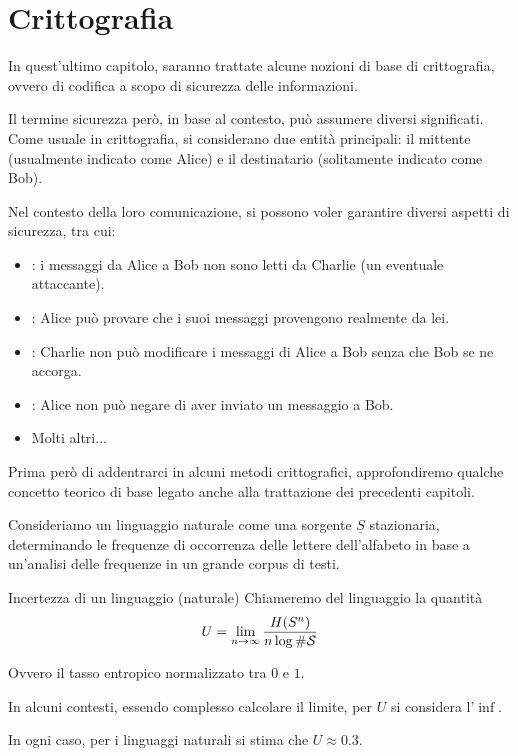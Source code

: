 \chapter{Crittografia}

In quest'ultimo capitolo, saranno trattate alcune nozioni di base di crittografia, ovvero di codifica a scopo di sicurezza delle informazioni.

Il termine sicurezza però, in base al contesto, può assumere diversi significati.
Come usuale in crittografia, si considerano due entità principali: il mittente (usualmente indicato come Alice) e il destinatario (solitamente indicato come Bob).

Nel contesto della loro comunicazione, si possono voler garantire diversi aspetti di sicurezza, tra cui:

\begin{itemize}
  \item {}: i messaggi da Alice a Bob non sono letti da Charlie (un eventuale attaccante).
  \item {}: Alice può provare che i suoi messaggi provengono realmente da lei.
  \item {}: Charlie non può modificare i messaggi di Alice a Bob senza che Bob se ne accorga.
  \item {}: Alice non può negare di aver inviato un messaggio a Bob.
  \item Molti altri...
\end{itemize}

Prima però di addentrarci in alcuni metodi crittografici, approfondiremo qualche concetto teorico di base legato anche alla trattazione dei precedenti capitoli.

Consideriamo un linguaggio naturale come una sorgente \(\underline{S}\) stazionaria, determinando le frequenze di occorrenza delle lettere dell'alfabeto in base a un'analisi delle frequenze in un grande corpus di testi.

\begin{definition}{Incertezza di un linguaggio (naturale)}
  Chiameremo  del linguaggio la quantità 
  \[U = \lim_{n\to\infty} \frac{H(S^n)}{n\log \#\mathcal{S}}\]

  Ovvero il tasso entropico normalizzato tra \(0\) e \(1\).
\end{definition}

\begin{note}{}
  In alcuni contesti, essendo complesso calcolare il limite, per \( U \) si considera l'\(\inf\).

  In ogni caso, per i linguaggi naturali si stima che \( U \approx 0.3 \).
\end{note}

